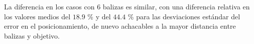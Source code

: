 La diferencia en los casos con 6 balizas es similar, con una diferencia relativa en los valores medios del $18.9$ \% y del $44.4$ \% para las desviaciones estándar del error en el posicionamiento, de nuevo achacables a la mayor distancia entre balizas y objetivo.

